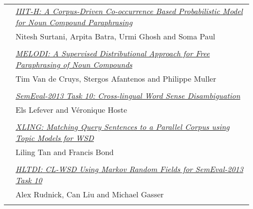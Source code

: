 \begin{tabular}{p{20mm}p{138mm}}
 & \hyperlink{page.153}{\em IIIT-H: A Corpus-Driven Co-occurrence Based Probabilistic Model for Noun Compound Paraphrasing}\\
         & Nitesh Surtani, Arpita Batra, Urmi Ghosh and Soma Paul \\
\\

& \hyperlink{page.144}{\em MELODI: A Supervised Distributional Approach for Free Paraphrasing of Noun Compounds}\\
         & Tim Van de Cruys, Stergos Afantenos and Philippe Muller \\
\\

 & \hyperlink{page.158}{\em SemEval-2013 Task 10: Cross-lingual Word Sense Disambiguation}\\
         & Els Lefever and V\'{e}ronique Hoste \\
\\

 & \hyperlink{page.167}{\em XLING: Matching Query Sentences to a Parallel Corpus using Topic Models for WSD}\\
         & Liling Tan and Francis Bond \\
\\

 & \hyperlink{page.171}{\em HLTDI: CL-WSD Using Markov Random Fields for SemEval-2013 Task 10}\\
         & Alex Rudnick, Can Liu and Michael Gasser \\
\\


\end{tabular}
\newpage
